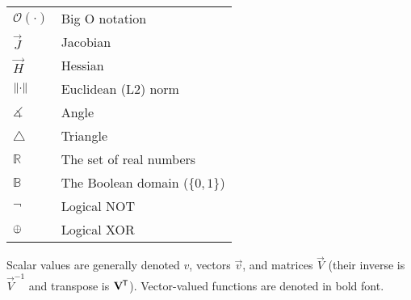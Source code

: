 \begin{table}[h!]
\begin{tabular}{l|l}
        $\mathcal{O}(\cdot)$ & Big O notation \\
        $\vec{J}$ & Jacobian \\
        $\vec{H}$ & Hessian \\
        $\left\lVert\cdot\right\rVert$ & Euclidean (L2) norm \\
        $\measuredangle$ & Angle \\
        $\triangle$ & Triangle \\
        $\mathbb{R}$ & The set of real numbers \\
        $\mathbb{B}$ & The Boolean domain ($\{0,1\}$) \\
        $\neg$ & Logical NOT \\
        $\oplus$ & Logical XOR
    \end{tabular}
\end{table}

\noindent
Scalar values are generally denoted $v$, vectors $\vec{v}$, and matrices $\vec{V}$ (their inverse is $\vec{V}^{-1}$ and transpose is $\mathbf{V}^{\mkern-1.5mu\mathsf{T}}$).
Vector-valued functions are denoted in bold font.